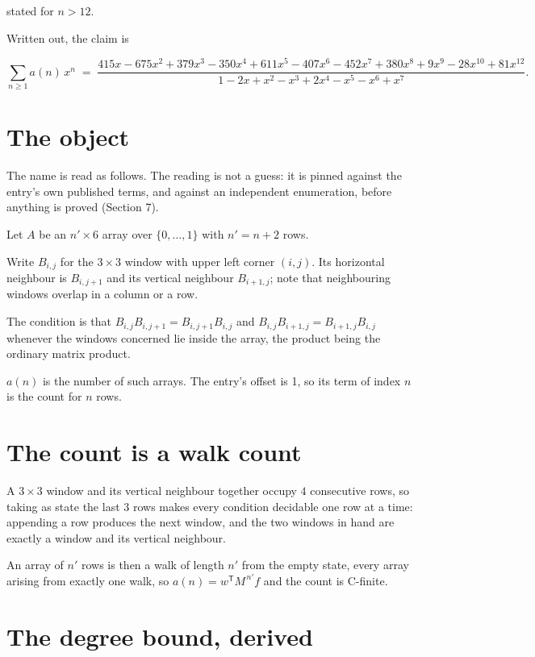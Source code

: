 \documentclass[11pt]{article}
\theoremstyle{definition}
\begin{document}
stated for $n > 12$.

Written out, the claim is

\[\sum_{n \ge 1} a(n)\,x^n \;=\; \frac{415x - 675x^{2} + 379x^{3} - 350x^{4} + 611x^{5} - 407x^{6} - 452x^{7} + 380x^{8} + 9x^{9} - 28x^{10} + 81x^{12}}{1 - 2x + x^{2} - x^{3} + 2x^{4} - x^{5} - x^{6} + x^{7}}.\]

\section{The object}

The name is read as follows. The reading is not a guess: it is pinned against the entry's own published terms, and against an independent enumeration, before anything is proved (Section 7).

Let $A$ be an $n' \times 6$ array over $\{0,\dots,1\}$ with $n' = n + 2$ rows.

Write $B_{i,j}$ for the $3\times3$ window with upper left corner $(i,j)$. Its horizontal neighbour is $B_{i,j+1}$ and its vertical neighbour $B_{i+1,j}$; note that neighbouring windows overlap in a column or a row.

The condition is that $B_{i,j}B_{i,j+1} = B_{i,j+1}B_{i,j}$ and $B_{i,j}B_{i+1,j} = B_{i+1,j}B_{i,j}$ whenever the windows concerned lie inside the array, the product being the ordinary matrix product.

$a(n)$ is the number of such arrays. The entry's offset is 1, so its term of index $n$ is the count for $n$ rows.

\section{The count is a walk count}

A $3\times3$ window and its vertical neighbour together occupy $4$ consecutive rows, so taking as state the last $3$ rows makes every condition decidable one row at a time: appending a row produces the next window, and the two windows in hand are exactly a window and its vertical neighbour.

An array of $n'$ rows is then a walk of length $n'$ from the empty state, every array arising from exactly one walk, so $a(n) = w^{\mathsf T}M^{\,n'}f$ and the count is C-finite.

\section{The degree bound, derived}
\end{document}
